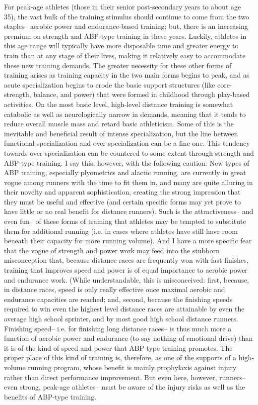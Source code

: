 For peak-age athletes (those in their senior post-secondary years to about age 35), the vast bulk of the training stimulus should continue to come from the two staples-- aerobic power and endurance-based training; but, there is an increasing premium on strength and ABP-type training in these years. Luckily, athletes in this age range will typically have more disposable time and greater energy to train than at any stage of their lives, making it relatively easy to accommodate these new training demands. The greater necessity for these other forms of training arises as training capacity in the two main forms begins to peak, and as acute specialization begins to erode the basic support structures (like core-strength, balance, and power) that were formed in childhood through play-based activities. On the most basic level, high-level distance training is somewhat catabolic as well as neurologically narrow in demands, meaning that it tends to reduce overall muscle mass and retard basic athleticism. Some of this is the inevitable and beneficial result of intense specialization, but the line between functional specialization and over-specialization can be a fine one. This tendency towards over-specialization can be countered to some extent through strength and ABP-type training. I say this, however, with the following caution: New types of ABP training, especially plyometrics and alactic running, are currently in great vogue among runners with the time to fit them in, and many are quite alluring in their novelty and apparent sophistication, creating the strong impression that they must be useful and effective (and certain specific forms may yet prove to have little or no real benefit for distance runners). Such is the attractiveness-- and even fun-- of these forms of training that athletes may be tempted to substitute them for additional running (i.e. in cases where athletes have still have room beneath their capacity for more running volume). And I have a more specific fear that the vogue of strength and power work may feed into the stubborn misconception that, because distance races are frequently won with fast finishes, training that improves speed and power is of equal importance to aerobic power and endurance work. (While understandable, this is misconceived: first, because, in distance races, speed is only really effective once maximal aerobic and endurance capacities are reached; and, second, because the finishing speeds required to win even the highest level distance races are attainable by even the average high school sprinter, and by most good high school distance runners. Finishing speed-- i.e. for finishing long distance races-- is thus much more a function of aerobic power and endurance (to say nothing of emotional drive) than it is of the kind of speed and power that ABP-type training promotes. The proper place of this kind of training is, therefore, as one of the supports of a high-volume running program, whose benefit is mainly prophylaxis against injury rather than direct performance improvement. But even here, however, runners-- even strong, peak-age athletes-- must be aware of the injury risks as well as the benefits of ABP-type training.

